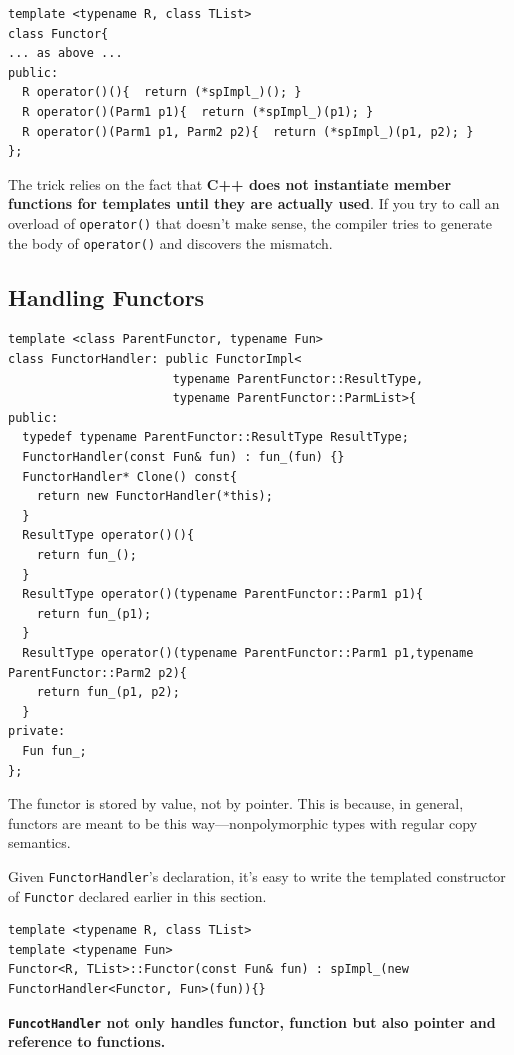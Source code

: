 \begin{verbatim}
template <typename R, class TList>
class Functor{
... as above ...
public:
  R operator()(){  return (*spImpl_)(); }
  R operator()(Parm1 p1){  return (*spImpl_)(p1); }
  R operator()(Parm1 p1, Parm2 p2){  return (*spImpl_)(p1, p2); }
};
\end{verbatim}

The  trick relies on the fact that \textbf{C++ does not instantiate member
  functions for templates until they are actually used}. If you try to call an overload
of \texttt{operator()} that doesn't make sense, the compiler tries to generate
the body of \texttt{operator()} and discovers the mismatch.

\subsection{Handling Functors}

\begin{verbatim}
template <class ParentFunctor, typename Fun>
class FunctorHandler: public FunctorImpl<
                       typename ParentFunctor::ResultType, 
                       typename ParentFunctor::ParmList>{
public:
  typedef typename ParentFunctor::ResultType ResultType;
  FunctorHandler(const Fun& fun) : fun_(fun) {}
  FunctorHandler* Clone() const{ 
    return new FunctorHandler(*this); 
  }
  ResultType operator()(){
    return fun_();
  }
  ResultType operator()(typename ParentFunctor::Parm1 p1){
    return fun_(p1);
  }
  ResultType operator()(typename ParentFunctor::Parm1 p1,typename ParentFunctor::Parm2 p2){
    return fun_(p1, p2);
  }
private:
  Fun fun_;
};
\end{verbatim}

The functor is stored by value, not by pointer. This is because, in general,
functors are meant to be this way—nonpolymorphic types with regular
copy semantics.

Given \texttt{FunctorHandler}'s declaration, it's easy to write the templated
constructor of \texttt{Functor} declared earlier in this section.

\begin{verbatim}
template <typename R, class TList>
template <typename Fun>
Functor<R, TList>::Functor(const Fun& fun) : spImpl_(new FunctorHandler<Functor, Fun>(fun)){}
\end{verbatim}

\textbf{\texttt{FuncotHandler} not only handles functor, function but
  also pointer and reference to functions.}


